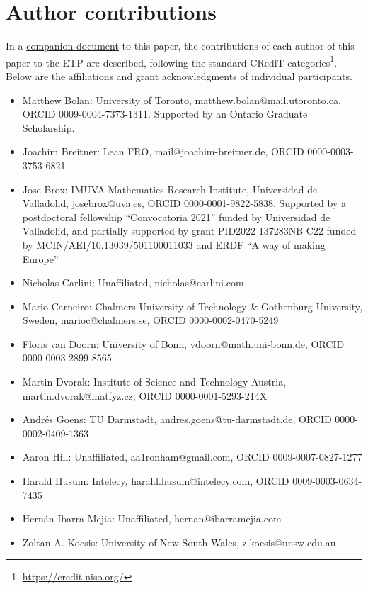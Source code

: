 \section{Author contributions}

In a \href{https://github.com/teorth/equational_theories/blob/main/paper/contributions.md}{companion document} to this paper, the contributions of each author of this paper to the ETP are described, following the standard CRediT categories\footnote{\url{https://credit.niso.org/}}. Below are the affiliations and grant acknowledgments of individual participants.


\begin{itemize}\raggedright
    \item Matthew Bolan: University of Toronto, matthew.bolan@mail.utoronto.ca, ORCID 0009-0004-7373-1311. Supported by an Ontario Graduate Scholarship.
    \item Joachim Breitner: Lean FRO, mail@joachim-breitner.de, ORCID 0000-0003-3753-6821
    \item Jose Brox: IMUVA-Mathematics Research Institute, Universidad de Valladolid, josebrox@uva.es, ORCID 0000-0001-9822-5838. Supported by a postdoctoral fellowship “Convocatoria 2021” funded by Universidad de Valladolid, and partially supported by grant PID2022-137283NB-C22 funded by MCIN/AEI/10.13039/501100011033 and ERDF “A way of making Europe”
    \item Nicholas Carlini: Unaffiliated, nicholas@carlini.com
    \item Mario Carneiro: Chalmers University of Technology \& Gothenburg University, Sweden, marioc@chalmers.se, ORCID 0000-0002-0470-5249
    \item Floris van Doorn: University of Bonn, vdoorn@math.uni-bonn.de, ORCID 0000-0003-2899-8565
    \item Martin Dvorak: Institute of Science and Technology Austria, martin.dvorak@matfyz.cz, ORCID 0000-0001-5293-214X
    \item Andr\'es Goens: TU Darmstadt, andres.goens@tu-darmstadt.de, ORCID 0000-0002-0409-1363
    \item Aaron Hill: Unaffiliated, aa1ronham@gmail.com, ORCID 0009-0007-0827-1277
    \item Harald Husum: Intelecy, harald.husum@intelecy.com, ORCID 0009-0003-0634-7435
    \item Hern\'an Ibarra Mejia: Unaffiliated, hernan@ibarramejia.com
    \item Zoltan A. Kocsis: University of New South Wales, z.kocsis@unsw.edu.au

\end{itemize}
